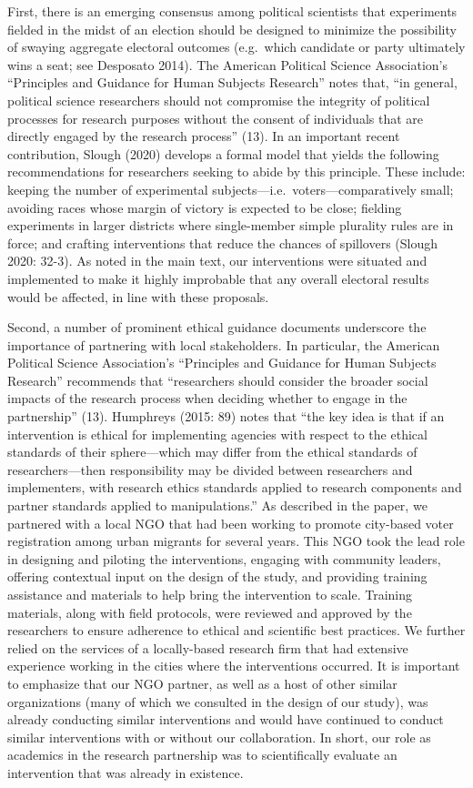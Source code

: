 \documentclass[
  11.5pt,
]{article}
\begin{document}
First, there is an emerging consensus among political scientists that
experiments fielded in the midst of an election should be designed to
minimize the possibility of swaying aggregate electoral outcomes
(e.g.~which candidate or party ultimately wins a seat; see Desposato
2014). The American Political Science Association's ``Principles and
Guidance for Human Subjects Research'' notes that, ``in general,
political science researchers should not compromise the integrity of
political processes for research purposes without the consent of
individuals that are directly engaged by the research process'' (13). In
an important recent contribution, Slough (2020) develops a formal model
that yields the following recommendations for researchers seeking to
abide by this principle. These include: keeping the number of
experimental subjects---i.e.~voters---comparatively small; avoiding
races whose margin of victory is expected to be close; fielding
experiments in larger districts where single-member simple plurality
rules are in force; and crafting interventions that reduce the chances
of spillovers (Slough 2020: 32-3). As noted in the main text, our
interventions were situated and implemented to make it highly improbable
that any overall electoral results would be affected, in line with these
proposals.

Second, a number of prominent ethical guidance documents underscore the
importance of partnering with local stakeholders. In particular, the
American Political Science Association's ``Principles and Guidance for
Human Subjects Research'' recommends that ``researchers should consider
the broader social impacts of the research process when deciding whether
to engage in the partnership'' (13). Humphreys (2015: 89) notes that
``the key idea is that if an intervention is ethical for implementing
agencies with respect to the ethical standards of their sphere---which
may differ from the ethical standards of researchers---then
responsibility may be divided between researchers and implementers, with
research ethics standards applied to research components and partner
standards applied to manipulations.'' As described in the paper, we
partnered with a local NGO that had been working to promote city-based
voter registration among urban migrants for several years. This NGO took
the lead role in designing and piloting the interventions, engaging with
community leaders, offering contextual input on the design of the study,
and providing training assistance and materials to help bring the
intervention to scale. Training materials, along with field protocols,
were reviewed and approved by the researchers to ensure adherence to
ethical and scientific best practices. We further relied on the services
of a locally-based research firm that had extensive experience working
in the cities where the interventions occurred. It is important to
emphasize that our NGO partner, as well as a host of other similar
organizations (many of which we consulted in the design of our study),
was already conducting similar interventions and would have continued to
conduct similar interventions with or without our collaboration. In
short, our role as academics in the research partnership was to
scientifically evaluate an intervention that was already in existence.
\end{document}

